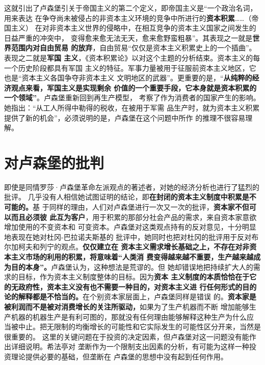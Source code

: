 这就引出了卢森堡引关于帝国主义的第二个定义，即帝国主义是“一个政治名词，用来表达
在争夺尚未被侵占的非资本主义环境的竞争中所进行的\textbf{资本积累}……（帝国主义）
在对非资本主义世界的侵略中，在相互竞争的资本主义国家之间发生的日益严重的冲突中，
变得愈来愈无法无天，愈来愈野蛮粗暴”。其表现之一就是\textbf{世界范围内对自由贸易
  的放弃}，自由贸易“仅仅是资本主义积累史上的一个插曲”。表现之二就是\textbf{军国
  主义}，《资本积累论》以对这个主题的分析结束。资本主义的每一个历史阶段都具有军国
主义的特征。军事力量被用于征服前资本主义地区，它也是“资本主义各国争夺非资本主义
文明地区的武器”。更重要的是，“\textbf{从纯粹的经济观点来看，军国主义是实现剩余
  价值的一个重要手段，它本身就是资本积累的一个领域”}。卢森堡重新回到再生产模型，
考察了作为消费者的国家产生的影响。她指出：“从工人所得中勒得的税收，在被用于军需
品生产时，就为资本主义积累提供了新的机会”，必须说明的是，卢森堡在这个问题中所作
的推理不很容易理解。

\section{对卢森堡的批判}
即使是同情罗莎·卢森堡革命左派观点的著述者，对她的经济分析也进行了猛烈的批评。
几乎没有人相信她试图证明的结论，即\textbf{在封闭的资本主义制度中积累是不可能的。}基
于同样的理由，人们对卢森堡进行一次又一次的批评，\textbf{资本家不但可以而且必须彼
  此互为客户}，用于积累的那部分社会产品的需求，来自资本家意欲增加使用的不变资本和
可变资本。卢森堡对这类观点持有的反对意见，十分明显地表现在她对杜冈-巴拉诺夫斯基的
批评中，她同时也把对杜冈的批评用于反对布尔加柯夫和列宁的观点。\textbf{仅仅建立在
  资本主义需求增长基础之上，不存在对非资本主义市场的利用的积累，将意味着“人类消
  费变得越来越不重要，生产越来越成为目的本身”。}卢森堡认为，这种想法是荒谬的。但
她却错误地把持续扩大人的需求的目标，作为资本主义制度整体的目标。因为\textbf{资本
  主义制度的本质恰恰在于它的无政府性，资本主义没有也不需要一种目的，对资本主义进
  行任何形式的目的论的解释都是不恰当的。}在个别资本家层面上，卢森堡同样是错误
的。\textbf{资本家是被利润而不是被对消费增长的关注所驱动，}如果为了生产机器而不断
增加能够生产机器的机器生产是有利可图的，那就没有任何理由能够解释这种生产为什么应
当被中止。把无限制的均衡增长的可能性和它实际发生的可能性区分开来，当然是很重要的。
这里的关键问题在于投资的决定因素，但卢森堡对这一问题没有能作出详细说明。希法亭对
垄断作为一个限制支出因素的分析，有可能为这样一种投资理论提供必要的基础，但垄断在
卢森堡的思想中没有起到任何作用。


